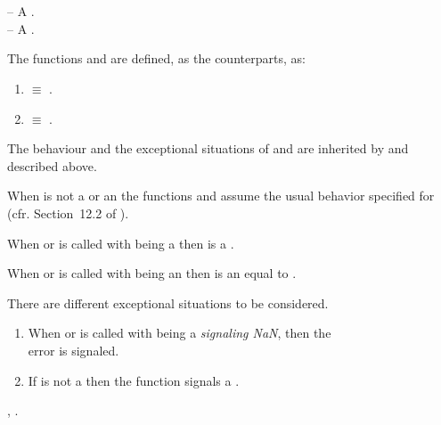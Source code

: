 \documentclass[../Arithmetic-Operations.tex]{subfiles}
\begin{document}

\DSyntax{}

  \RArrow ~ \\
  \RArrow ~ \\

\DArgsNValues{}

 -- A .\\
 -- A .


\DDescription{}

The functions  and  are defined, 
as the \CL{} counterparts, as:
\begin{enumerate}
\item {}
\code{)} $\equiv$ \code{(+}
.
\item {}
\code{)} $\equiv$ \code{(-}
.
\end{enumerate}

The behaviour and the exceptional situations of  and
 are inherited by \code{+} and \code{-} described above.

When  is not a  or an
 the functions  and 
assume the usual behavior specified for \CL{} (cfr.
Section~12.2 of \cite{1996:ANSIHyperSpec}).

When  or  is called with  being a
 then  is a .

When  or  is called with  being an
 then   is an
 equal to .

\DExceptional{}

There are different exceptional situations to be considered.

\begin{enumerate}
\item When  or  is called with 
  being a \emph{signaling NaN}, then the\\
   error is signaled.

\item If  is not a \CL{}  then the function
  signals a .
\end{enumerate}

\DSeeAlso{}

\code{+}, \code{-}.
\end{document}
